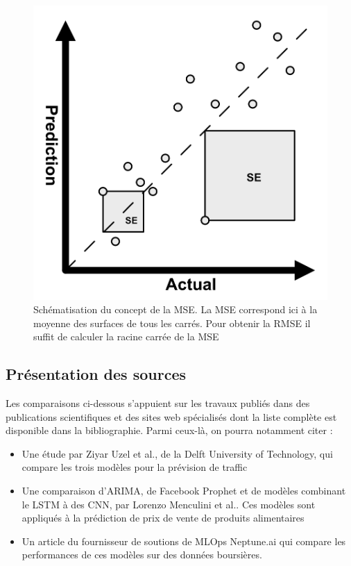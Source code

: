 \documentclass[french]{article}
\begin{document}
    \begin{figure}[h!]
        \includegraphics[width=12cm]{mse}
        \centering
        \caption{Schématisation du concept de la MSE. La MSE correspond ici à la moyenne des surfaces de tous les carrés. Pour obtenir la RMSE il suffit de calculer la racine carrée de la MSE}
        \centering
    \end{figure}

    \subsection{Présentation des sources}

    Les comparaisons ci-dessous s'appuient sur les travaux publiés dans des publications scientifiques et des sites web spécialisés dont la liste complète est disponible dans la bibliographie. Parmi ceux-là, on pourra notamment citer :
    \begin{itemize}
        \item Une étude par Ziyar Uzel et al., de la Delft University of Technology\cite{uzel}, qui compare les trois modèles pour la prévision de traffic 
        \item Une comparaison d'ARIMA, de Facebook Prophet et de modèles combinant le LSTM à des CNN, par Lorenzo Menculini et al.\cite{menculini}. Ces modèles sont appliqués à la prédiction de prix de vente de produits alimentaires
        \item Un article du fournisseur de soutions de MLOps Neptune.ai\cite{neptune} qui compare les performances de ces modèles sur des données boursières.
    \end{itemize}
\end{document}
